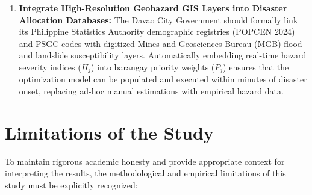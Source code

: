 \begin{enumerate}
    \item \textbf{Integrate High-Resolution Geohazard GIS Layers into Disaster Allocation Databases:}
    The Davao City Government should formally link its Philippine Statistics Authority demographic registries (POPCEN 2024) and PSGC codes with digitized Mines and Geosciences Bureau (MGB) flood and landslide susceptibility layers. Automatically embedding real-time hazard severity indices ($H_j$) into barangay priority weights ($P_j$) ensures that the optimization model can be populated and executed within minutes of disaster onset, replacing ad-hoc manual estimations with empirical hazard data.
\end{enumerate}


\section{Limitations of the Study}
\label{sec:limitations}

To maintain rigorous academic honesty and provide appropriate context for interpreting the results, the methodological and empirical limitations of this study must be explicitly recognized:

